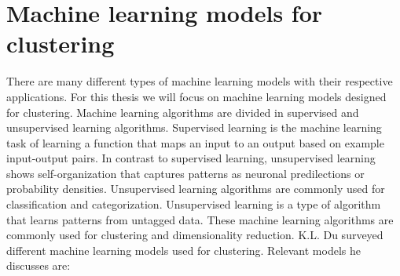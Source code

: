 \documentclass[../main]{subfiles}
\begin{document}
\section{Machine learning models for clustering}
\label{ch:neuralNetworkSurvey}
There are many different types of machine learning models with their respective applications.
For this thesis we will focus on machine learning models designed for clustering.
\newline
Machine learning algorithms are divided in supervised and unsupervised learning algorithms\cite{supervisedUnsupervised}.
Supervised learning is the machine learning task of learning a function that maps an input to an output based on example input-output pairs\cite{supervisedUnsupervised}.
In contrast to supervised learning, unsupervised learning shows self-organization that captures patterns as neuronal predilections or probability densities\cite{supervisedUnsupervised}.
Unsupervised learning algorithms are commonly used for classification and categorization\cite{supervisedUnsupervised}.
Unsupervised learning is a type of algorithm that learns patterns from untagged data\cite{supervisedUnsupervised}.
These machine learning algorithms are commonly used for clustering and dimensionality reduction\cite{supervisedUnsupervised}.
\newline
K.L. Du surveyed different machine learning models used for clustering\cite{Du2010Clustering:Approach}.
Relevant models he discusses are:
\end{document}

